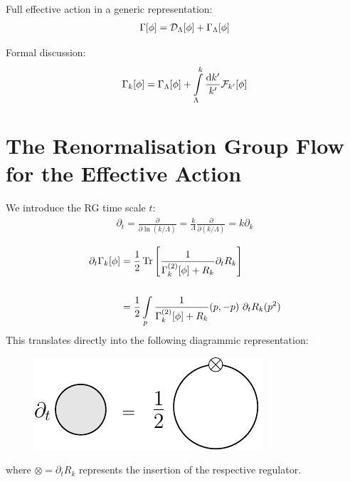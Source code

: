 Full effective action in a generic representation:
\begin{align}
	\Gamma[\phi] = \mathcal{D}_{\Lambda}[\phi] + \Gamma_{\Lambda}[\phi]
\end{align}

Formal discussion:
\begin{align}
\Gamma_{k}[\phi] = \Gamma_{\Lambda}[\phi] + \int\limits_{\Lambda}^k \frac{\dd k'}{k'} \mathcal{F}_{k'}[\phi]
\end{align}
 
 
\section{The Renormalisation Group Flow  for the Effective Action}
We introduce the RG time scale $t$:
\begin{align}
	\partial_t = \frac{\partial}{\partial\ln(k/\Lambda)} = \frac{k}{\Lambda}\frac{\partial}{\partial(k/\Lambda)} = k \partial_k
\end{align}

\blindtext

\begin{align}
	\partial_t\Gamma_{k}[\phi] &= \frac{1}{2}\operatorname{Tr}\left[ \frac{1}{\Gamma_{k}^{(2)}[\phi] + R_k} \partial_t R_k \right] \nonumber \\ \phantom{.}  \\
							&= \frac{1}{2}\int\limits_p \frac{1}{\Gamma_{k}^{(2)}[\phi] + R_k}(p, -p) \ \partial_t R_k(p^2) \nonumber
\end{align}
This translates directly into the following diagrammic representation:
\begin{figure}[H]
\centering
\includegraphics{figs/TikZ/wetterich_equation}
\end{figure}
where $\otimes = \partial_t R_k$ represents the insertion of the respective regulator. \\

\blindtext

